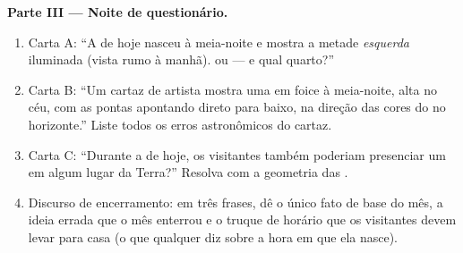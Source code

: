 \begin{problem}
\medskip\noindent\textbf{Parte III --- Noite de questionário.}
\begin{enumerate}[resume]
  \item Carta A: ``A  de hoje nasceu à meia-noite e mostra a
        metade \emph{esquerda} iluminada (vista rumo à manhã).
         ou  --- e qual quarto?''
  \item Carta B: ``Um cartaz de artista mostra uma  em foice à
        meia-noite, alta no céu, com as pontas apontando direto para
        baixo, na direção das cores do  no horizonte.''
        Liste todos os erros astronômicos do cartaz.
  \item Carta C: ``Durante a  de hoje, os visitantes também
        poderiam presenciar um  em algum lugar da
        Terra?'' Resolva com a geometria das .
  \item Discurso de encerramento: em três frases, dê o único fato de
        base do mês, a ideia errada que o mês enterrou e o truque de
        horário que os visitantes devem levar para casa (o que
        qualquer  diz sobre a hora em que ela nasce).
\end{enumerate}
\end{problem}
